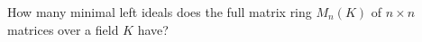 How many minimal left ideals does the full matrix ring $M_n(K)$ of $n\times n$ matrices over a field $K$ have?